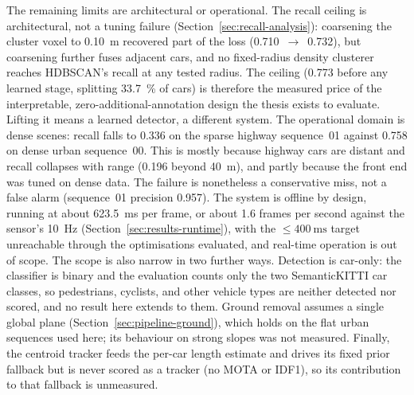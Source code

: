 The remaining limits are architectural or operational. The recall ceiling is architectural,
not a tuning failure (Section~\ref{sec:recall-analysis}): coarsening the cluster voxel to
\SI{0.10}{\metre} recovered part of the loss (\num{0.710}~$\rightarrow$~\num{0.732}), but
coarsening further fuses adjacent cars, and no fixed-radius density clusterer reaches HDBSCAN's
recall at any tested radius. The ceiling (\num{0.773} before any learned stage, splitting
\SI{33.7}{\percent} of cars) is therefore the measured price of the interpretable,
zero-additional-annotation design the thesis exists to evaluate. Lifting it
means a learned detector, a different system. The operational domain is dense scenes: recall falls to
\num{0.336} on the sparse highway sequence~01 against \num{0.758} on dense urban sequence~00.
This is mostly because highway cars are distant and recall collapses with range (\num{0.196} beyond
\SI{40}{\metre}), and partly because the front end was tuned on dense data. The failure
is nonetheless a conservative miss, not a false alarm (sequence~01 precision \num{0.957}). The system is
offline by design, running at about \SI{623.5}{\milli\second} per frame, or about \num{1.6} frames
per second against the sensor's \SI{10}{\hertz}
(Section~\ref{sec:results-runtime}), with the $\leq\SI{400}{\milli\second}$ target unreachable
through the optimisations evaluated, and real-time operation is out of scope. The scope is
also narrow in two further ways. Detection is car-only: the classifier is binary and the
evaluation counts only the two SemanticKITTI car classes, so pedestrians, cyclists, and other
vehicle types are neither detected nor scored, and no result here extends to them. Ground
removal assumes a single global plane (Section~\ref{sec:pipeline-ground}), which holds on the
flat urban sequences used here; its behaviour on strong slopes was not measured. Finally, the centroid
tracker feeds the per-car length estimate and drives its fixed prior fallback but is never
scored as a tracker (no MOTA or IDF1), so its contribution to that fallback is unmeasured.


